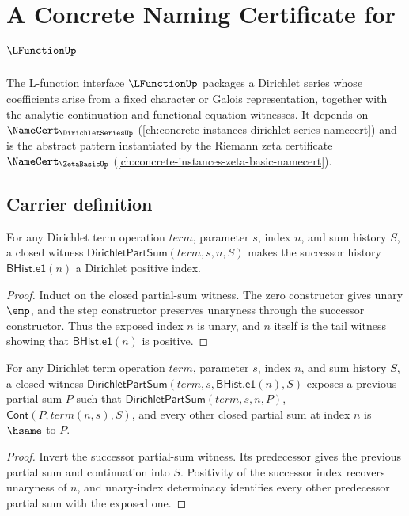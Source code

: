 \chapter{A Concrete Naming Certificate for $\LFunctionUp$}
\label{ch:concrete-instances-lfunction-namecert}

The L-function interface $\LFunctionUp$ packages a Dirichlet series whose coefficients arise from a fixed character or Galois representation, together with the analytic continuation and functional-equation witnesses. It depends on $\NameCert_{\DirichletSeriesUp}$ (\autoref{ch:concrete-instances-dirichlet-series-namecert}) and is the abstract pattern instantiated by the Riemann zeta certificate $\NameCert_{\ZetaBasicUp}$ (\autoref{ch:concrete-instances-zeta-basic-namecert}).

\section{Carrier definition}
\label{sec:lfunction-carrier}

\begin{theorem}
\label{thm:lfunction-dirichlet-part-sum-successor-positive-index}
For any Dirichlet term operation $term$, parameter $s$, index $n$, and sum
history $S$, a closed witness
$\mathsf{DirichletPartSum}(term,s,n,S)$ makes the successor history
$\mathsf{BHist.e1}(n)$ a Dirichlet positive index.
\end{theorem}
\begin{proof}
Induct on the closed partial-sum witness. The zero constructor gives unary
$\emp$, and the step constructor preserves unaryness through the successor
constructor. Thus the exposed index $n$ is unary, and $n$ itself is the tail
witness showing that $\mathsf{BHist.e1}(n)$ is positive.
\end{proof}

\begin{theorem}
\label{thm:lfunction-dirichlet-part-sum-successor-previous-unique}
For any Dirichlet term operation $term$, parameter $s$, index $n$, and sum
history $S$, a closed witness
$\mathsf{DirichletPartSum}(term,s,\mathsf{BHist.e1}(n),S)$ exposes a previous
partial sum $P$ such that
$\mathsf{DirichletPartSum}(term,s,n,P)$, $\mathsf{Cont}(P,term(n,s),S)$, and
every other closed partial sum at index $n$ is $\hsame$ to $P$.
\end{theorem}
\begin{proof}
Invert the successor partial-sum witness. Its predecessor gives the previous
partial sum and continuation into $S$. Positivity of the successor index
recovers unaryness of $n$, and unary-index determinacy identifies every other
predecessor partial sum with the exposed one.
\end{proof}

